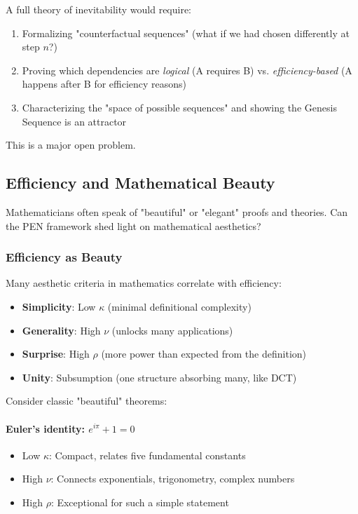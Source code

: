 \documentclass[11pt]{article}
\theoremstyle{definition}
\begin{document}
A full theory of inevitability would require:
\begin{enumerate}
\item Formalizing "counterfactual sequences" (what if we had chosen differently at step $n$?)
\item Proving which dependencies are \emph{logical} (A requires B) vs. \emph{efficiency-based} (A happens after B for efficiency reasons)
\item Characterizing the "space of possible sequences" and showing the Genesis Sequence is an attractor
\end{enumerate}

This is a major open problem.

\subsection{Efficiency and Mathematical Beauty}

Mathematicians often speak of "beautiful" or "elegant" proofs and theories. Can the PEN framework shed light on mathematical aesthetics?

\subsubsection{Efficiency as Beauty}

Many aesthetic criteria in mathematics correlate with efficiency:

\begin{itemize}
\item \textbf{Simplicity}: Low $\kappa$ (minimal definitional complexity)
\item \textbf{Generality}: High $\nu$ (unlocks many applications)
\item \textbf{Surprise}: High $\rho$ (more power than expected from the definition)
\item \textbf{Unity}: Subsumption (one structure absorbing many, like DCT)
\end{itemize}

Consider classic "beautiful" theorems:

\paragraph{Euler's identity: $e^{i\pi} + 1 = 0$}
\begin{itemize}
\item Low $\kappa$: Compact, relates five fundamental constants
\item High $\nu$: Connects exponentials, trigonometry, complex numbers
\item High $\rho$: Exceptional for such a simple statement
\end{itemize}
\end{document}
